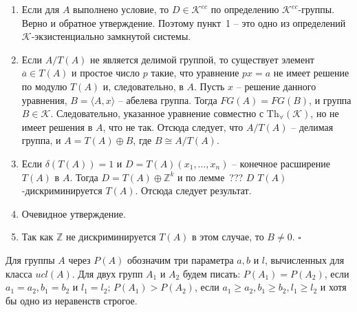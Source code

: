\documentclass[12pt]{extarticle} %
\def\proof{{\noindent{\bf Доказательство.}} }
\def\K{{\mathcal{K}}}
\def\Kec{\mathcal{K}^{ec}}
\def\Z{{\mathbb{Z}}}
\def\Tha{{\mathrm{Th}_\forall}}
\begin{document}
\proof \begin{enumerate}
\item Если для $A$ выполнено условие, то $D \in \Kec$ по определению $\Kec$-группы. Верно и обратное утверждение. Поэтому пункт~1 -- это одно из определений $\K$-экзистенциально замкнутой системы.

\item Если $A \Big/ T(A)$ не является делимой группой, то существует элемент $\overline{a} \in T(A)$ и простое число $p$ такие, что уравнение $px = a$ не имеет решение по модулю $T(A)$ и, следовательно, в $A$. Пусть $x$ -- решение данного уравнения, $B = \langle A, x\rangle$ -- абелева группа. Тогда $FG(A) = FG(B)$, и группа $B \in \K$. Следовательно, указанное уравнение совместно с $\Tha(\K)$, но не имеет решения в $A$, что не так. Отсюда следует, что $A \Big/ T(A)$ -- делимая группа, и $A = T(A) \oplus B$, где $B \cong A \Big/ T(A)$.

\item Если $\delta(T(A)) = 1$ и $D = T(A)(x_1, \ldots, x_n)$ -- конечное расширение $T(A)$ в $A$. Тогда $D = T(A) \oplus \Z^k$ и по лемме~??? $D$ $T(A)$-дискриминируется $T(A)$. Отсюда следует результат. 

\item Очевидное утверждение.

\item Так как $\Z$ не дискриминируется $T(A)$ в этом случае, то $B \neq 0$. $\square$
\end{enumerate}






Для группы $A$ через $P(A)$ обозначим три параметра $a, b$ и $l$, вычисленных для класса $ucl(A)$. Для двух групп $A_1$ и $A_2$ будем писать: $P(A_1) = P(A_2)$, если $a_1 = a_2, b_1 = b_2$ и $l_1 = l_2$; $P(A_1) > P(A_2)$, если $a_1 \geq a_2, b_1 \geq b_2, l_1 \geq l_2$ и хотя бы одно из неравенств строгое.
\end{document}
